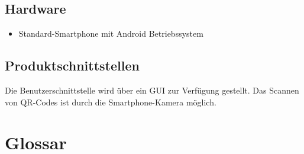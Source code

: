 \documentclass[parskip=full]{scrartcl}
\begin{document}
\subsection{Hardware}
\begin{itemize}
    \item Standard-Smartphone mit Android Betriebssystem
\end{itemize}

\subsection{Produktschnittstellen}
Die Benutzerschnittstelle wird über ein GUI zur Verfügung gestellt.
Das Scannen von QR-Codes ist durch die Smartphone-Kamera möglich.
\newpage

\section{Glossar}
\printglossary[type=\acronymtype]
\end{document}
